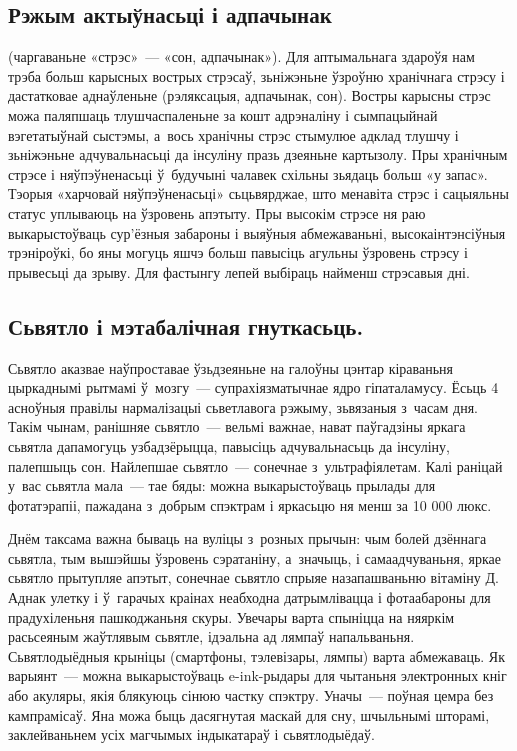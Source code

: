 \subsection{Рэжым актыўнасьці і адпачынак} (чаргаваньне «стрэс»~--- «сон, адпачынак»).
Для аптымальнага здароўя нам трэба больш карысных вострых стрэсаў, зьніжэньне ўзроўню хранічнага стрэсу і дастатковае аднаўленьне (рэляксацыя, адпачынак, сон). Востры карысны стрэс можа паляпшаць тлушчаспаленьне за кошт адрэналіну і сымпацыйнай вэгетатыўнай сыстэмы, а~вось хранічны стрэс стымулюе адклад тлушчу і зьніжэньне адчувальнасьці да інсуліну празь дзеяньне картызолу. Пры хранічным стрэсе і няўпэўненасьці ў~будучыні чалавек схільны зьядаць больш «у запас». Тэорыя «харчовай няўпэўненасьці» сьцьвярджае, што менавіта стрэс і сацыяльны статус уплываюць на ўзровень апэтыту. Пры высокім стрэсе ня раю выкарыстоўваць сур'ёзныя забароны і выяўныя абмежаваньні, высокаінтэнсіўныя трэніроўкі, бо яны могуць яшчэ больш павысіць агульны ўзровень стрэсу і прывесьці да зрыву. Для фастынгу лепей выбіраць найменш стрэсавыя дні.

\subsection{Сьвятло і мэтабалічная гнуткасьць.}
Сьвятло аказвае наўпроставае ўзьдзеяньне на галоўны цэнтар кіраваньня цыркаднымі рытмамі ў~мозгу~--- супрахіязматычнае ядро гіпаталамусу. Ёсьць 4 асноўныя правілы нармалізацыі сьветлавога рэжыму, зьвязаныя з~часам дня. Такім чынам, ранішняе сьвятло~--- вельмі важнае, нават паўгадзіны яркага сьвятла дапамогуць узбадзёрыцца, павысіць адчувальнасьць да інсуліну, палепшыць сон. Найлепшае сьвятло~--- сонечнае з~ультрафіялетам. Калі раніцай у~вас сьвятла мала~--- тае бяды: можна выкарыстоўваць прылады для фотатэрапіі, пажадана з~добрым спэктрам і яркасьцю ня менш за 10 000 люкс.

Днём таксама важна бываць на вуліцы з~розных прычын: чым болей дзённага сьвятла, тым вышэйшы ўзровень сэратаніну, а~значыць, і самаадчуваньня, яркае сьвятло прытупляе апэтыт, сонечнае сьвятло спрыяе назапашваньню вітаміну Д. Аднак улетку і ў~гарачых краінах неабходна датрымлівацца і фотаабароны для прадухіленьня пашкоджаньня скуры. Увечары варта спыніцца на няяркім расьсеяным жаўтлявым сьвятле, ідэальна ад лямпаў напальваньня. Сьвятлодыёдныя крыніцы (смартфоны, тэлевізары, лямпы) варта абмежаваць. Як варыянт~--- можна выкарыстоўваць e-ink-рыдары для чытаньня электронных кніг або акуляры, якія блякуюць сінюю частку спэктру. Уначы~--- поўная цемра без кампрамісаў. Яна можа быць дасягнутая маскай для сну, шчыльнымі шторамі, заклейваньнем усіх магчымых індыкатараў і сьвятлодыёдаў.

